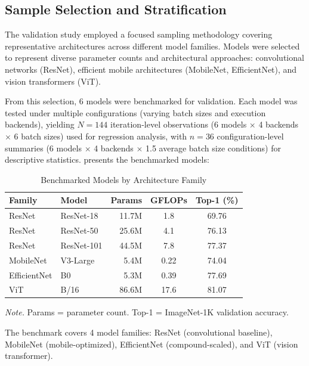 \documentclass[10pt,twocolumn,a4paper]{article}
\theoremstyle{definition}
\theoremstyle{plain}
\begin{document}
\subsection{Sample Selection and Stratification}

The validation study employed a focused sampling methodology covering representative architectures across different model families. Models were selected to represent diverse parameter counts and architectural approaches: convolutional networks (ResNet), efficient mobile architectures (MobileNet, EfficientNet), and vision transformers (ViT).

From this selection, 6 models were benchmarked for validation. Each model was tested under multiple configurations (varying batch sizes and execution backends), yielding $N = 144$ iteration-level observations (6 models $\times$ 4 backends $\times$ 6 batch sizes) used for regression analysis, with $n = 36$ configuration-level summaries (6 models $\times$ 4 backends $\times$ 1.5 average batch size conditions) for descriptive statistics.  presents the benchmarked models:

\begin{table}[t]
\centering
\caption{Benchmarked Models by Architecture Family}
\label{tab:models}
\scriptsize
\setlength{\tabcolsep}{4pt}
\begin{tabular}{@{}llrcc@{}}
\toprule
\textbf{Family} & \textbf{Model} & \textbf{Params} & \textbf{GFLOPs} & \textbf{Top-1 (\%)} \\
\midrule
ResNet & ResNet-18 & 11.7M & 1.8 & 69.76 \\
ResNet & ResNet-50 & 25.6M & 4.1 & 76.13 \\
ResNet & ResNet-101 & 44.5M & 7.8 & 77.37 \\
MobileNet & V3-Large & 5.4M & 0.22 & 74.04 \\
EfficientNet & B0 & 5.3M & 0.39 & 77.69 \\
ViT & B/16 & 86.6M & 17.6 & 81.07 \\
\bottomrule
\end{tabular}

\vspace{0.5em}
\noindent\textit{Note.} Params = parameter count. Top-1 = ImageNet-1K validation accuracy.
\end{table}

The benchmark covers 4 model families: ResNet (convolutional baseline), MobileNet (mobile-optimized), EfficientNet (compound-scaled), and ViT (vision transformer).
\end{document}
